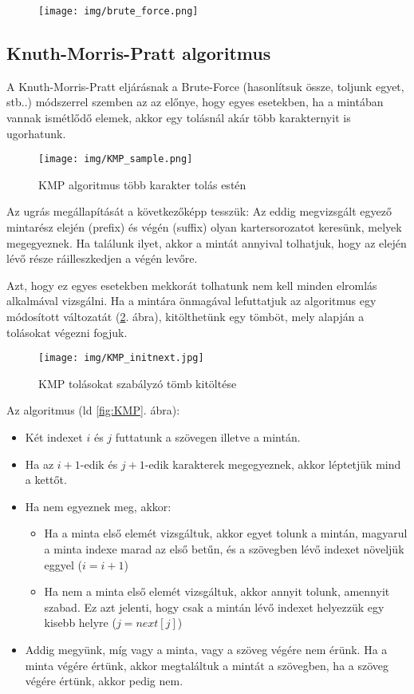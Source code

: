 \documentclass[margin=0px]{article}
\begin{document}
\begin{figure}[H]
    \centering
    \texttt{[image: img/brute\_force.png]}
\end{figure}

\subsection{Knuth-Morris-Pratt algoritmus}
A Knuth-Morris-Pratt eljárásnak a Brute-Force (hasonlítsuk össze, toljunk egyet, stb..) módszerrel szemben az az előnye, hogy egyes esetekben, ha a mintában vannak ismétlődő elemek, akkor egy tolásnál akár több karakternyit is ugorhatunk.

\begin{figure}[H]
    \centering
    \texttt{[image: img/KMP\_sample.png]}
    \caption{KMP algoritmus több karakter tolás estén}
    \label{fig:KMP_sample}
\end{figure}

Az ugrás megállapítását a következőképp tesszük: Az eddig megvizsgált egyező mintarész elején (prefix) és végén (suffix) olyan kartersorozatot keresünk, melyek megegyeznek. Ha találunk ilyet, akkor a mintát annyival tolhatjuk, hogy az elején lévő része ráilleszkedjen a végén levőre.

Azt, hogy ez egyes esetekben mekkorát tolhatunk nem kell minden elromlás alkalmával vizsgálni. Ha a mintára önmagával lefuttatjuk az algoritmus egy módosított változatát (\ref{fig:KMP_initnext}. ábra), kitölthetünk egy tömböt, mely alapján a tolásokat végezni fogjuk.

\begin{figure}[H]
    \centering
    \texttt{[image: img/KMP\_initnext.jpg]}
    \caption{KMP tolásokat szabályzó tömb kitöltése}
    \label{fig:KMP_initnext}
\end{figure}

Az algoritmus (ld \ref{fig:KMP}. ábra):
\begin{itemize}
    \item Két indexet $i$ és $j$ futtatunk a szövegen illetve a mintán.
    \item Ha az $i+1$-edik és $j+1$-edik karakterek megegyeznek, akkor léptetjük mind a kettőt.
    \item Ha nem egyeznek meg, akkor:
          \begin{itemize}
              \item Ha a minta első elemét vizsgáltuk, akkor egyet tolunk a mintán, magyarul a minta indexe marad az első betűn, és a szövegben lévő indexet növeljük eggyel ($i=i+1$)
              \item Ha nem a minta első elemét vizsgáltuk, akkor annyit tolunk, amennyit szabad. Ez azt jelenti, hogy csak a mintán lévő indexet helyezzük egy kisebb helyre ($j = next[j]$)
          \end{itemize}
    \item Addig megyünk, míg vagy a minta, vagy a szöveg végére nem érünk. Ha a minta végére értünk, akkor megtaláltuk a mintát a szövegben, ha a szöveg végére értünk, akkor pedig nem.
\end{itemize}
\end{document}
